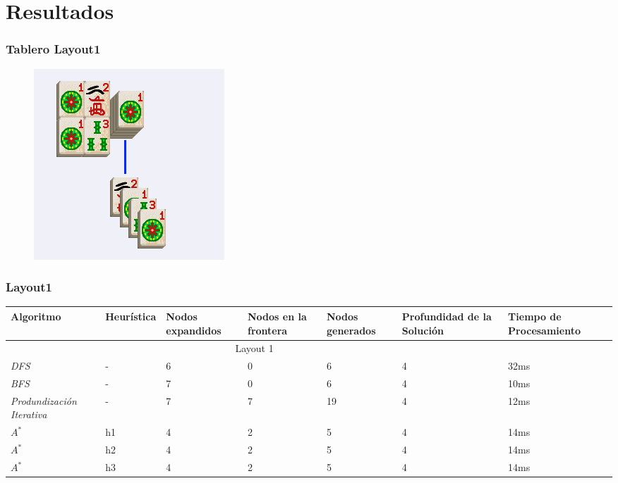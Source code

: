 \documentclass{beamer}
\begin{document}
\section{Resultados}

\begin{frame}
\frametitle{Tablero Layout1}
\begin{figure}[hb]
	\includegraphics[scale=0.3]{../Boards/Layout1.png}
\end{figure}
\end{frame}

\begin{frame}
\frametitle{Layout1}

\tiny{
\begin{table}[h]
\begin{center}
	\begin{tabular}{|p{1.3cm}|p{1.0cm}|p{1cm}|p{1cm}|p{1cm}|p{1cm}|p{2cm}|}
	\hline
	 Algoritmo & Heur\'istica & Nodos expandidos & Nodos en la frontera & Nodos generados & Profundidad de la Soluci\'on & Tiempo de Procesamiento\\
	\hline \hline
		 \multicolumn{6}{|c|}{Layout 1} \\
	\hline
	\textit{DFS} & - & 6 & 0 & 6 & 4 & 32ms \\
	\textit{BFS} & - & 7 & 0 & 6 & 4 & 10ms \\
	\textit{Produndizaci\'on Iterativa} & - & 7 &  7 & 19 & 4 & 12ms \\
	\textit{$A^*$} & h1 & 4 & 2 & 5 & 4 & 14ms \\
	\textit{$A^*$} & h2 & 4 & 2 & 5 & 4 & 14ms \\
	\textit{$A^*$} & h3 & 4 & 2 & 5 & 4 & 14ms \\
	\hline
	\end{tabular}
\end{center}
\label{tab:costLayout1}
\end{table}}

\end{frame}
\end{document}
